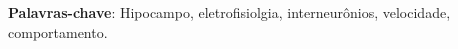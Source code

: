 


\vspace{1.5ex}

{\bf Palavras-chave}: Hipocampo, eletrofisiolgia, interneurônios, velocidade, comportamento.

